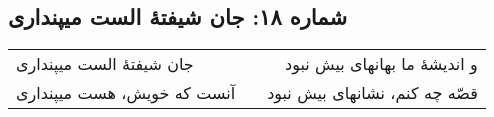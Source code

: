 \begin{center}
\section*{شماره ۱۸: جان شیفتۀ الست میپنداری}
\label{sec:018}
\begin{longtable}{l p{0.5cm} r}
جان شیفتهٔ الست میپنداری
&&
و اندیشهٔ ما بهانهای بیش نبود
\\
آنست که خویش، هست میپنداری
&&
قصّه چه کنم، نشانهای بیش نبود
\\
\end{longtable}
\end{center}
